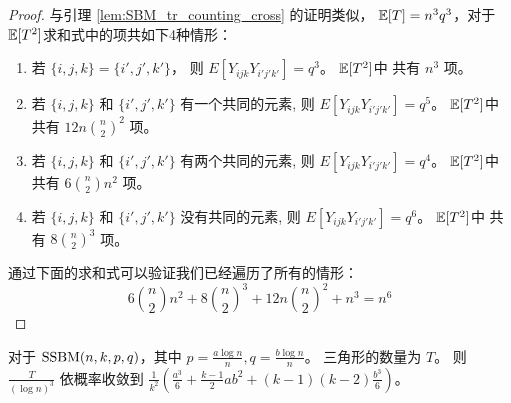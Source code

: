 \begin{proof}
	与引理 \ref{lem:SBM_tr_counting_cross} 的证明类似，
	$\operatorname{\mathbb{E}}[T] = n^3 q^3$，对于$\operatorname{\mathbb{E}}[T^2]$求和式中的项共如下4种情形：
	\begin{enumerate}
	\item 若 $\{i,j,k\} = \{i',j',k'\}$， 则 $E[Y_{ijk}Y_{i'j'k'}] = q^3$。
	$\operatorname{\mathbb{E}}[T^2]$中 共有 $n^3$ 项。
	\item 若 $\{i,j,k\}$ 和 $\{i',j',k'\}$ 有一个共同的元素, 则 $E[Y_{ijk}Y_{i'j'k'}] = q^5$。
	$\operatorname{\mathbb{E}}[T^2]$中 共有 $12n\binom{n}{2}^2$ 项。
	\item 若 $\{i,j,k\}$ 和 $\{i',j',k'\}$ 有两个共同的元素, 则 $E[Y_{ijk}Y_{i'j'k'}] = q^4$。
	$\operatorname{\mathbb{E}}[T^2]$中 共有 $6\binom{n}{2}n^2$ 项。
	\item 若 $\{i,j,k\}$ 和 $\{i',j',k'\}$ 没有共同的元素, 则  $E[Y_{ijk}Y_{i'j'k'}] = q^6$。
	$\operatorname{\mathbb{E}}[T^2]$中 共有 $8\binom{n}{2}^3$ 项。
\end{enumerate}	
通过下面的求和式可以验证我们已经遍历了所有的情形：
$$
6\binom{n}{2}n^2  + 8\binom{n}{2}^3 + 12n\binom{n}{2}^2 +  n^3 = n^6
$$
\end{proof}
\begin{lemma}\label{lem:sbmV}
 对于 $\operatorname{SSBM}(n, k, p, q)$，其中 $p=\frac{a\log n}{n}, q = \frac{b\log n}{n}$。
 三角形的数量为 $T$。
	则 $\frac{T}{(\log n)^3}$ 依概率收敛到 $\frac{1}{k^2}(\frac{a^3}{6} + \frac{k-1}{2}ab^2 + (k-1)(k-2)\frac{b^3}{6} )$。
\end{lemma}

